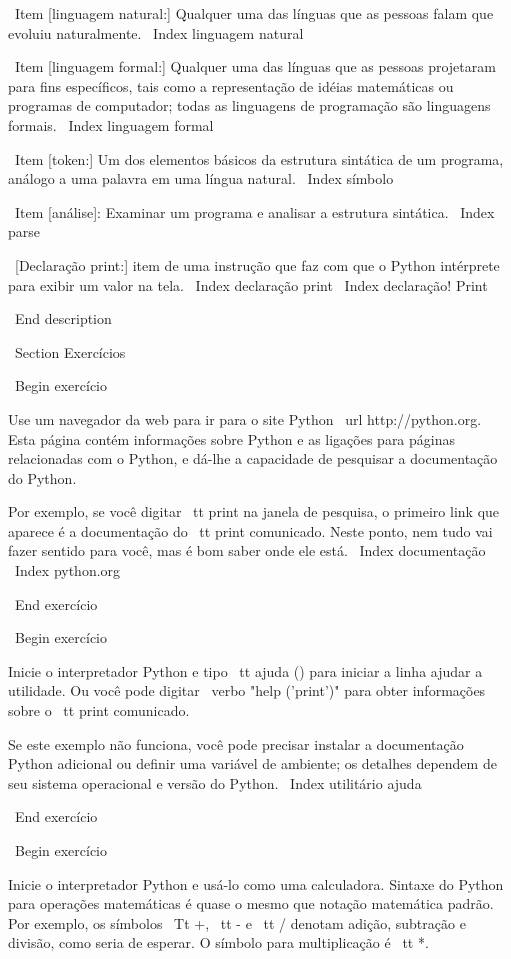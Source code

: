 \documentclass[10pt]{book}
\begin{document}
{\ Item [linguagem natural:] Qualquer uma das línguas que as pessoas falam que
evoluiu naturalmente.
\ Index {linguagem natural}

\ Item [linguagem formal:] Qualquer uma das línguas que as pessoas projetaram
para fins específicos, tais como a representação de idéias matemáticas ou
programas de computador; todas as linguagens de programação são linguagens formais.
\ Index {linguagem formal}

\ Item [token:] Um dos elementos básicos da estrutura sintática de
um programa, análogo a uma palavra em uma língua natural.
\ Index {símbolo}

\ Item [análise]: Examinar um programa e analisar a estrutura sintática.
\ Index {} parse

\ [Declaração print:] item de uma instrução que faz com que o Python
intérprete para exibir um valor na tela.
\ Index {declaração print}
\ Index {declaração! Print}


\ End {description}


\ Section {Exercícios}

\ Begin {} exercício

Use um navegador da web para ir para o site Python \ url {http://python.org}.
Esta página contém informações sobre Python e as ligações
para páginas relacionadas com o Python, e dá-lhe a capacidade de pesquisar
a documentação do Python.

Por exemplo, se você digitar {\ tt print} na janela de pesquisa, o
primeiro link que aparece é a documentação do {\ tt print}
comunicado. Neste ponto, nem tudo vai fazer sentido para você,
mas é bom saber onde ele está.
\ Index {} documentação
\ Index {} python.org

\ End {} exercício

\ Begin {} exercício

Inicie o interpretador Python e tipo {\ tt ajuda ()} para iniciar a linha
ajudar a utilidade. Ou você pode digitar \ verbo "help ('print')" para obter informações
sobre o {\ tt print} comunicado.

Se este exemplo não funciona, você
pode precisar instalar a documentação Python adicional ou definir uma
variável de ambiente; os detalhes dependem de seu sistema operacional e
versão do Python.
\ Index {utilitário ajuda}

\ End {} exercício

\ Begin {} exercício

Inicie o interpretador Python e usá-lo como uma calculadora.
Sintaxe do Python para operações matemáticas é quase o mesmo que
notação matemática padrão. Por exemplo, os símbolos
{\ Tt +}, {\ tt -} e {\ tt /} denotam adição, subtração
e divisão, como seria de esperar. O símbolo para
multiplicação é {\ tt *}.

}
\end{document}
